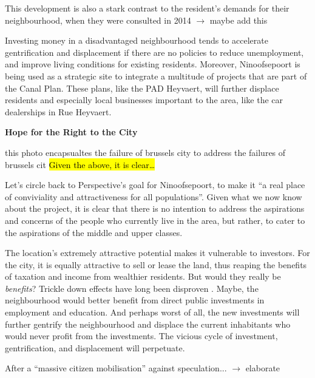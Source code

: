 \documentclass{article}[11pt]
\begin{document}
This development is also a stark contrast to the resident's demands for their neighbourhood, when they were consulted in 2014 $\rightarrow$ maybe add this

Investing money in a disadvantaged neighbourhood tends to accelerate gentrification and displacement if there are no policies to reduce unemployment, and improve living conditions for existing residents.
Moreover, Ninoofsepoort is being used as a strategic site to integrate a multitude of projects that are part of the Canal Plan. These plans, like the PAD Heyvaert, will further displace residents and especially local businesses important to the area, like the car dealerships in Rue Heyvaert.

\textbf{Hope for the Right to the City}

this photo encapsualtes the failure of brussels city to address the failures of brussels cit
\hl{Given the above, it is clear\dots}

Let's circle back to Perspective's goal for Ninoofsepoort, to make it ``a real place of conviviality and attractiveness for all populations''. Given what we now know about the project, it is clear that there is no intention to address the aspirations and concerns of the people who currently live in the area, but rather, to cater to the aspirations of the middle and upper classes.

The location's extremely attractive potential makes it vulnerable to investors. For the city, it is equally attractive to sell or lease the land, thus reaping the benefits of taxation and income from wealthier residents. But would they really be \textit{benefits}? Trickle down effects have long been disproven \parencite{biden2018speech}. Maybe, the neighbourhood would better benefit from direct public investments in employment and education. And perhaps worst of all, the new investments will further gentrify the neighbourhood and displace the current inhabitants who would never profit from the investments.
The vicious cycle of investment, gentrification, and displacement will perpetuate.

After a ``massive citizen mobilisation'' against speculation... $\rightarrow$  elaborate
\end{document}

